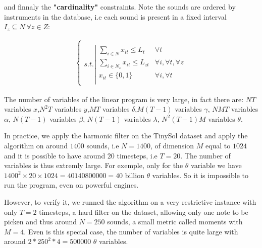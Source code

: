 \documentclass[a4paper]{book}
\begin{document}
    
and finnaly the \textbf{"cardinality"} constraints. Note the sounds are ordered by instruments in the database, i.e each sound is present in a fixed interval $I_z \subseteq N\  \forall z \in Z$:


\begin{center}
   \begin{eqnarray*}
     \ \left \{ \begin{array}{ll}
     \\
  
    s.t. \left |
    \begin{array}{llll}
   
   \sum \limits_{i \in N} x_{it} \leq L_t & \forall t \\
   \sum \limits_{i \in N_z} x_{it} \leq L_{zt} & \forall i, \forall t, \forall z\\
    x_{it} \in \{0,1\} & \forall i, \forall{t} \\

    
    \end{array}
    \right.
    \end{array} 
    \right.
    \end{eqnarray*}
    \end{center}
    
The number of variables of the linear program is very large, in fact there are: $NT$ variables $x$,$N^2T$ variables $y$,$MT$ variables $\delta$,$M(T-1)$ variables $\gamma$, $NMT$ variables $\alpha$, $N(T-1)$ variables $\beta$, $N(T-1)$ variables $\lambda$, $N^2(T-1)M$ variables $\theta$.

In practice, we apply the harmonic filter on the TinySol dataset and apply the algorithm on around $1400$ sounds, i.e $N=1400$, of dimension $M$ equal to $1024$ and it is possible to have around $20$ timesteps, i.e $T=20$. The number of variables is thus extremly large. For exemple, only for the $\theta$ variable we have $1400^2 \times 20 \times 1024 = 40140800000 = 40$ billion $\theta$ variables. So it is impossible to run the program, even on powerful engines.  

However, to verify it, we runned the algorithm on a very restrictive instance with only $T=2$ timesteps, a hard filter on the dataset, allowing only one note to be picken and thus around $N=250$ sounds, a small metric called moments with $M=4$. Even is this special case, the number of variables is quite large with around $2*250^2*4=500000$ $\theta$ variables. 
\end{document}
